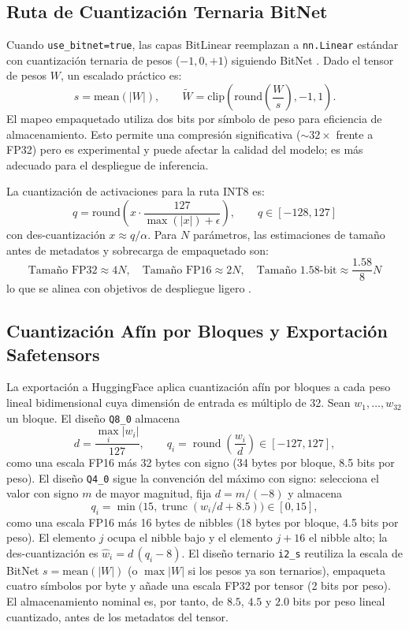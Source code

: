 \subsection{Ruta de Cuantización Ternaria BitNet}

Cuando \texttt{use\_bitnet=true}, las capas BitLinear reemplazan a \texttt{nn.Linear} estándar con cuantización ternaria de pesos ($-1, 0, +1$) siguiendo BitNet \citep{wang_bitnet_2023}. Dado el tensor de pesos $W$, un escalado práctico es:
\[
s=\text{mean}(|W|),\qquad
\tilde{W}=\text{clip}\left(\text{round}\left(\frac{W}{s}\right),-1,1\right).
\]
El mapeo empaquetado utiliza dos bits por símbolo de peso para eficiencia de almacenamiento. Esto permite una compresión significativa ($\sim 32\times$ frente a FP32) pero es experimental y puede afectar la calidad del modelo; es más adecuado para el despliegue de inferencia.

La cuantización de activaciones para la ruta INT8 es:
\[
q=\text{round}\left(x\cdot\frac{127}{\max(|x|)+\epsilon}\right),\qquad q\in[-128,127]
\]
con des-cuantización $x\approx q/\alpha$. Para $N$ parámetros, las estimaciones de tamaño antes de metadatos y sobrecarga de empaquetado son:
\[
\text{Tamaño FP32}\approx 4N,\quad \text{Tamaño FP16}\approx 2N,\quad \text{Tamaño 1.58-bit}\approx \frac{1.58}{8}N
\]
lo que se alinea con objetivos de despliegue ligero \citep{samson_lightweight_2026,bravin_embbert_2026}.

\subsection{Cuantización Afín por Bloques y Exportación Safetensors}
\label{sec:annex-block-affine}

La exportación a HuggingFace aplica cuantización afín por bloques a cada peso lineal bidimensional cuya dimensión de entrada es múltiplo de 32. Sean $w_1,\ldots,w_{32}$ un bloque. El diseño \texttt{Q8\_0} almacena
\[
d=\frac{\max_i |w_i|}{127},\qquad q_i=\operatorname{round}\!\left(\frac{w_i}{d}\right)\in[-127,127],
\]
como una escala FP16 más 32 bytes con signo (34 bytes por bloque, 8.5 bits por peso). El diseño \texttt{Q4\_0} sigue la convención del máximo con signo: selecciona el valor con signo $m$ de mayor magnitud, fija $d=m/(-8)$ y almacena
\[
q_i=\min\!\bigl(15,\operatorname{trunc}(w_i/d+8.5)\bigr)\in[0,15],
\]
como una escala FP16 más 16 bytes de nibbles (18 bytes por bloque, 4.5 bits por peso). El elemento $j$ ocupa el nibble bajo y el elemento $j+16$ el nibble alto; la des-cuantización es $\hat w_i=d\,(q_i-8)$. El diseño ternario \texttt{i2\_s} reutiliza la escala de BitNet $s=\text{mean}(|W|)$ (o $\max|W|$ si los pesos ya son ternarios), empaqueta cuatro símbolos por byte y añade una escala FP32 por tensor (2 bits por peso). El almacenamiento nominal es, por tanto, de $8.5$, $4.5$ y $2.0$ bits por peso lineal cuantizado, antes de los metadatos del tensor.

